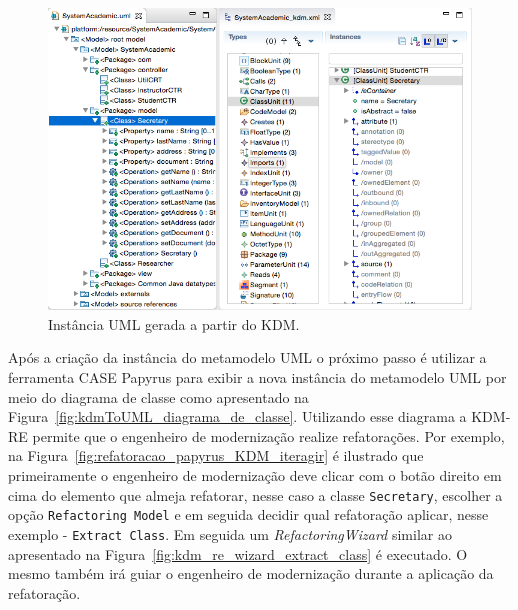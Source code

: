 \begin{figure}[!h]
	\centering
	\caption{Instância UML gerada a partir do KDM.}
	\label{fig:kdmToUML}
	\includegraphics[scale=0.5]{images/kdmToUML}
	\fautor
\end{figure}

Após a criação da instância do metamodelo UML o próximo passo é utilizar a ferramenta CASE Papyrus para exibir a nova instância do metamodelo UML por meio do diagrama de classe como apresentado na Figura~\ref{fig:kdmToUML_diagrama_de_classe}. Utilizando esse diagrama a KDM-RE permite que o engenheiro de modernização realize refatorações. Por exemplo, na Figura~\ref{fig:refatoracao_papyrus_KDM_iteragir} é ilustrado que primeiramente o engenheiro de modernização deve clicar com o botão direito em cima do elemento que almeja refatorar, nesse caso a classe \texttt{Secretary}, escolher a opção \texttt{Refactoring Model} e em seguida decidir qual refatoração aplicar, nesse exemplo - \texttt{Extract Class}. Em seguida um \textit{RefactoringWizard} similar ao apresentado na Figura~\ref{fig:kdm_re_wizard_extract_class} é executado. O mesmo também irá guiar o engenheiro de modernização durante a aplicação da refatoração. 

